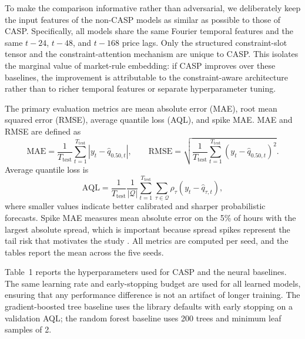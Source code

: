 \documentclass{article}
\begin{document}
To make the comparison informative rather than adversarial, we deliberately keep the input features of the non-CASP models as similar as possible to those of CASP. Specifically, all models share the same Fourier temporal features and the same $t-24$, $t-48$, and $t-168$ price lags. Only the structured constraint-slot tensor and the constraint-attention mechanism are unique to CASP. This isolates the marginal value of market-rule embedding: if CASP improves over these baselines, the improvement is attributable to the constraint-aware architecture rather than to richer temporal features or separate hyperparameter tuning.

The primary evaluation metrics are mean absolute error (MAE), root mean squared error (RMSE), average quantile loss (AQL), and spike MAE. MAE and RMSE are defined as
\[
\mathrm{MAE} = \frac{1}{T_{\mathrm{test}}} \sum_{t=1}^{T_{\mathrm{test}}} \left| y_t - \hat{q}_{0.50,t} \right|, \qquad
\mathrm{RMSE} = \sqrt{\frac{1}{T_{\mathrm{test}}} \sum_{t=1}^{T_{\mathrm{test}}} \left( y_t - \hat{q}_{0.50,t} \right)^2}.
\]
Average quantile loss is
\[
\mathrm{AQL} = \frac{1}{T_{\mathrm{test}}} \frac{1}{|\mathcal{Q}|} \sum_{t=1}^{T_{\mathrm{test}}} \sum_{\tau \in \mathcal{Q}} \rho_\tau\!\left(y_t - \hat{q}_{\tau,t}\right),
\]
where smaller values indicate better calibrated and sharper probabilistic forecasts. Spike MAE measures mean absolute error on the 5\% of hours with the largest absolute spread, which is important because spread spikes represent the tail risk that motivates the study \cite{sheybanivaziri2024forecasting}. All metrics are computed per seed, and the tables report the mean across the five seeds.

Table~1 reports the hyperparameters used for CASP and the neural baselines. The same learning rate and early-stopping budget are used for all learned models, ensuring that any performance difference is not an artifact of longer training. The gradient-boosted tree baseline uses the library defaults with early stopping on a validation AQL; the random forest baseline uses 200 trees and minimum leaf samples of 2.
\end{document}
